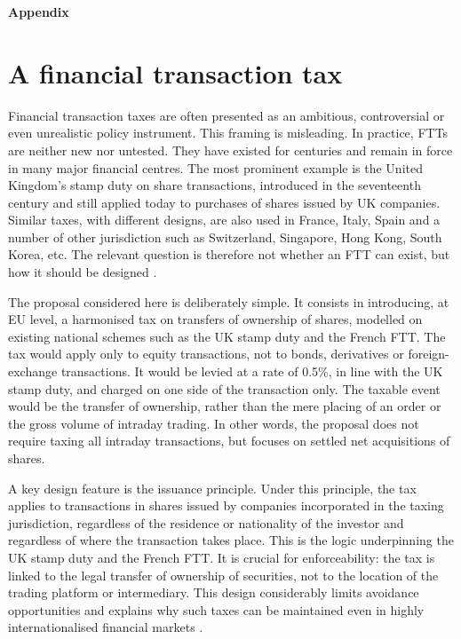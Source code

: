 \documentclass[../main]{subfiles}
\begin{document}
\newpage 

\textbf{\LARGE{Appendix}}

\section{A financial transaction tax}

Financial transaction taxes are often presented as an ambitious, controversial or even unrealistic policy instrument. This framing is misleading. In practice, FTTs are neither new nor untested. They have existed for centuries and remain in force in many major financial centres. The most prominent example is the United Kingdom’s stamp duty on share transactions, introduced in the seventeenth century and still applied today to purchases of shares issued by UK companies. Similar taxes, with different designs, are also used in France, Italy, Spain and a number of other jurisdiction such as Switzerland, Singapore, Hong Kong, South Korea, etc. The relevant question is therefore not whether an FTT can exist, but how it should be designed \citep{CapelleBlancard2024}.

The proposal considered here is deliberately simple. It consists in introducing, at EU level, a harmonised tax on transfers of ownership of shares, modelled on existing national schemes such as the UK stamp duty and the French FTT. The tax would apply only to equity transactions, not to bonds, derivatives or foreign-exchange transactions. It would be levied at a rate of 0.5\%, in line with the UK stamp duty, and charged on one side of the transaction only. The taxable event would be the transfer of ownership, rather than the mere placing of an order or the gross volume of intraday trading. In other words, the proposal does not require taxing all intraday transactions, but focuses on settled net acquisitions of shares.

A key design feature is the issuance principle. Under this principle, the tax applies to transactions in shares issued by companies incorporated in the taxing jurisdiction, regardless of the residence or nationality of the investor and regardless of where the transaction takes place. This is the logic underpinning the UK stamp duty and the French FTT. It is crucial for enforceability: the tax is linked to the legal transfer of ownership of securities, not to the location of the trading platform or intermediary. This design considerably limits avoidance opportunities and explains why such taxes can be maintained even in highly internationalised financial markets \citep{CapelleBlancardPersaud2025}.
\end{document}
